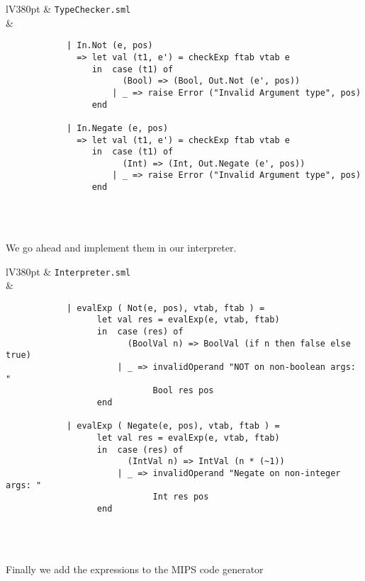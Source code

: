 \documentclass[a4paper]{article}
\begin{document}
\begin{center}	
	\begin{tabular}{lV{380pt}}
		\toprule
		& \verb|TypeChecker.sml|\\
		\midrule
		&
		\begin{verbatim}
			| In.Not (e, pos)
			  => let val (t1, e') = checkExp ftab vtab e
			     in  case (t1) of
			           (Bool) => (Bool, Out.Not (e', pos))
			         | _ => raise Error ("Invalid Argument type", pos)
			     end
			
			| In.Negate (e, pos)
			  => let val (t1, e') = checkExp ftab vtab e
			     in  case (t1) of
			           (Int) => (Int, Out.Negate (e', pos))
			         | _ => raise Error ("Invalid Argument type", pos)
			     end
		\end{verbatim}
		\\
		\bottomrule \\
	\end{tabular}
\end{center}

We go ahead and implement them in our interpreter.

\begin{center}	
	\begin{tabular}{lV{380pt}}
		\toprule
		& \verb|Interpreter.sml|\\
		\midrule
		&
		\begin{verbatim}
			| evalExp ( Not(e, pos), vtab, ftab ) =
			      let val res = evalExp(e, vtab, ftab)
			      in  case (res) of
			            (BoolVal n) => BoolVal (if n then false else true)
			          | _ => invalidOperand "NOT on non-boolean args: " 
			                 Bool res pos
			      end
			
			| evalExp ( Negate(e, pos), vtab, ftab ) =
			      let val res = evalExp(e, vtab, ftab)
			      in  case (res) of
			            (IntVal n) => IntVal (n * (~1))
			          | _ => invalidOperand "Negate on non-integer args: " 
			                 Int res pos
			      end
		\end{verbatim}
		\\
		\bottomrule \\
	\end{tabular}
\end{center}

Finally we add the expressions to the MIPS code generator
\end{document}
